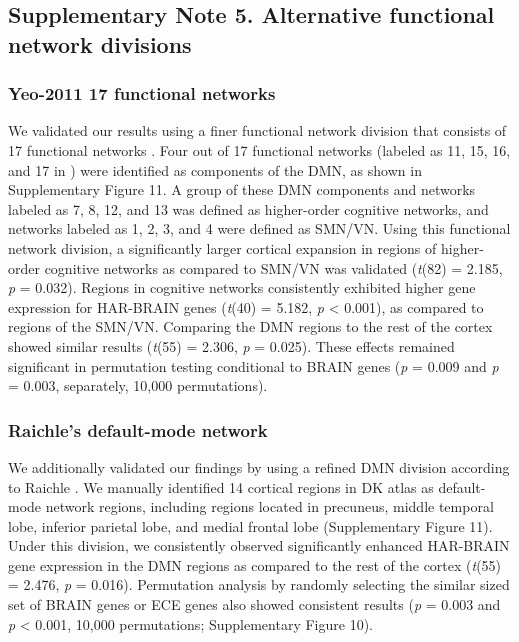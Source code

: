 \begin{refsection}
\subsection*{Supplementary Note 5. Alternative functional network divisions}
\subsubsection*{Yeo-2011 17 functional networks}
We validated our results using a finer functional network division that consists of 17 functional networks \citep{thomas2011organization}. Four out of 17 functional networks (labeled as 11, 15, 16, and 17 in \citep{thomas2011organization}) were identified as components of the DMN, as shown in Supplementary Figure 11. A group of these DMN components and networks labeled as 7, 8, 12, and 13 was defined as higher-order cognitive networks, and networks labeled as 1, 2, 3, and 4 were defined as SMN/VN. Using this functional network division, a significantly larger cortical expansion in regions of higher-order cognitive networks as compared to SMN/VN was validated (\textit{t}(82) = 2.185, \textit{p} = 0.032). Regions in cognitive networks consistently exhibited higher gene expression for HAR-BRAIN genes (\textit{t}(40) = 5.182, \textit{p} < 0.001), as compared to regions of the SMN/VN. Comparing the DMN regions to the rest of the cortex showed similar results (\textit{t}(55) = 2.306, \textit{p} = 0.025). These effects remained significant in permutation testing conditional to BRAIN genes (\textit{p} = 0.009 and \textit{p} = 0.003, separately, 10,000 permutations).

\subsubsection*{Raichle’s default-mode network}
We additionally validated our findings by using a refined DMN division according to Raichle \citep{raichle2015brain}. We manually identified 14 cortical regions in DK atlas as default-mode network regions, including regions located in precuneus, middle temporal lobe, inferior parietal lobe, and medial frontal lobe (Supplementary Figure 11). Under this division, we consistently observed significantly enhanced HAR-BRAIN gene expression in the DMN regions as compared to the rest of the cortex (\textit{t}(55) = 2.476, \textit{p} = 0.016). Permutation analysis by randomly selecting the similar sized set of BRAIN genes or ECE genes also showed consistent results (\textit{p} = 0.003 and \textit{p} < 0.001, 10,000 permutations; Supplementary Figure 10).


\end{refsection}

